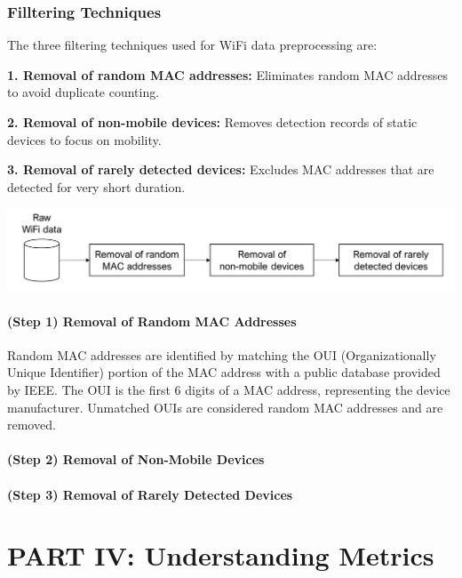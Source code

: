 \documentclass[
  letterpaper,
]{scrbook}
\begin{document}
\section{Filltering Techniques}\label{filltering-techniques}

The three filtering techniques used for WiFi data preprocessing are:

\textbf{1. Removal of random MAC addresses:} Eliminates random MAC
addresses to avoid duplicate counting.

\textbf{2. Removal of non-mobile devices:} Removes detection records of
static devices to focus on mobility.

\textbf{3. Removal of rarely detected devices:} Excludes MAC addresses
that are detected for very short duration.

\includegraphics{content/material/ch3/preprocessing.png}

\subsection{(Step 1) Removal of Random MAC
Addresses}\label{step-1-removal-of-random-mac-addresses}

Random MAC addresses are identified by matching the OUI
(Organizationally Unique Identifier) portion of the MAC address with a
public database provided by IEEE. The OUI is the first 6 digits of a MAC
address, representing the device manufacturer. Unmatched OUIs are
considered random MAC addresses and are removed.

\subsection{(Step 2) Removal of Non-Mobile
Devices}\label{step-2-removal-of-non-mobile-devices}

\subsection{(Step 3) Removal of Rarely Detected
Devices}\label{step-3-removal-of-rarely-detected-devices}

\part{PART IV: Understanding Metrics}
\end{document}
